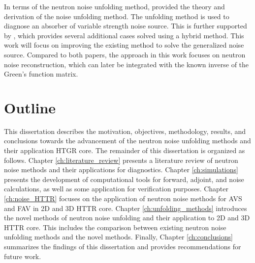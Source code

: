 In terms of the neutron noise unfolding method, \cite{demaziereIdentificationLocalizationAbsorbers2005} provided the theory and derivation of the noise unfolding method. The unfolding method is used to diagnose an absorber of variable strength noise source. This is further supported by \cite{hosseiniNoiseSourceReconstruction2014}, which provides several additional cases solved using a hybrid method. This work will focus on improving the existing method to solve the generalized noise source. Compared to both papers, the approach in this work focuses on neutron noise reconstruction, which can later be integrated with the known inverse of the Green’s function matrix.

\section{Outline}

This dissertation describes the motivation, objectives, methodology, results, and conclusions towards the advancement of the neutron noise unfolding methods and their application \gls*{HTGR} core.
The remainder of this dissertation is organized as follows.
Chapter \ref{ch:literature_review} presents a literature review of neutron noise methods and their applications for diagnostics.
Chapter \ref{ch:simulations} presents the development of computational tools for forward, adjoint, and noise calculations, as well as some application for verification purposes.
Chapter \ref{ch:noise_HTTR} focuses on the application of neutron noise methods for \gls*{AVS} and \gls*{FAV} in 2D and 3D \gls*{HTTR} core.
Chapter \ref{ch:unfolding_methods} introduces the novel methods of neutron noise unfolding and their application to 2D and 3D \gls*{HTTR} core. This includes the comparison between existing neutron noise unfolding methods and the novel methods.
Finally, Chapter \ref{ch:conclusions} summarizes the findings of this dissertation and provides recommendations for future work.
